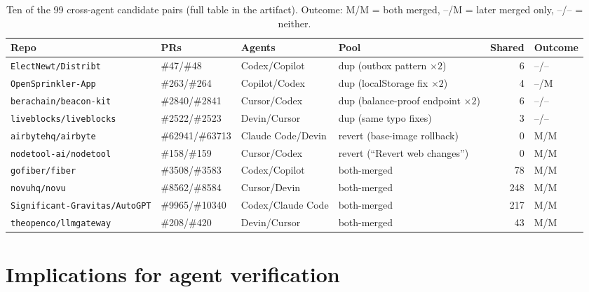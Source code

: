 \documentclass{article}
\begin{document}
\begin{table}[t]
\centering
\caption{Ten of the 99 cross-agent candidate pairs (full table in the artifact). Outcome: M/M = both merged, --/M = later merged only, --/-- = neither.}
\label{tab:crossagent}
\scriptsize
\begin{tabular}{@{}llllrl@{}}
\toprule
Repo & PRs & Agents & Pool & Shared & Outcome \\
\midrule
\texttt{ElectNewt/Distribt} & \#47/\#48 & Codex/Copilot & dup (outbox pattern $\times 2$) & 6 & --/-- \\ %
\texttt{OpenSprinkler-App} & \#263/\#264 & Copilot/Codex & dup (localStorage fix $\times 2$) & 4 & --/M \\ %
\texttt{berachain/beacon-kit} & \#2840/\#2841 & Cursor/Codex & dup (balance-proof endpoint $\times 2$) & 6 & --/-- \\ %
\texttt{liveblocks/liveblocks} & \#2522/\#2523 & Devin/Cursor & dup (same typo fixes) & 3 & --/-- \\ %
\texttt{airbytehq/airbyte} & \#62941/\#63713 & Claude Code/Devin & revert (base-image rollback) & 0 & M/M \\ %
\texttt{nodetool-ai/nodetool} & \#158/\#159 & Cursor/Codex & revert (``Revert web changes'') & 0 & M/M \\ %
\texttt{gofiber/fiber} & \#3508/\#3583 & Codex/Copilot & both-merged & 78 & M/M \\ %
\texttt{novuhq/novu} & \#8562/\#8584 & Cursor/Devin & both-merged & 248 & M/M \\ %
\texttt{Significant-Gravitas/AutoGPT} & \#9965/\#10340 & Codex/Claude Code & both-merged & 217 & M/M \\ %
\texttt{theopenco/llmgateway} & \#208/\#420 & Devin/Cursor & both-merged & 43 & M/M \\ %
\bottomrule
\end{tabular}
\end{table}

\section{Implications for agent verification}
\label{sec:implications}
\end{document}
